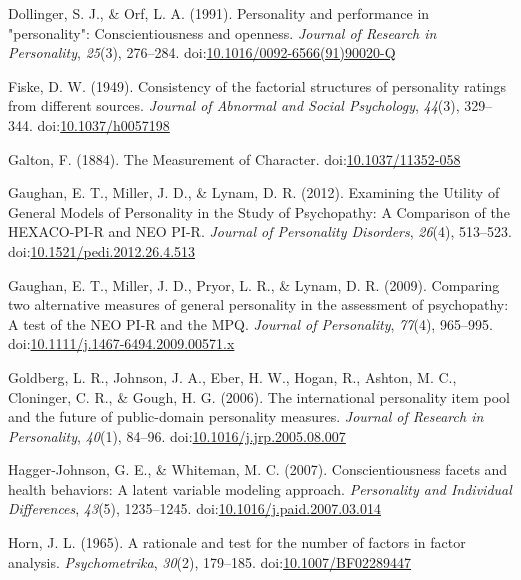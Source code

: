 \documentclass[,man]{apa6}
\theoremstyle{definition}
\theoremstyle{definition}
\theoremstyle{definition}
\theoremstyle{remark}
\begin{document}
\leavevmode\hypertarget{ref-Dollinger1991}{}%
Dollinger, S. J., \& Orf, L. A. (1991). Personality and performance in
"personality": Conscientiousness and openness. \emph{Journal of Research
in Personality}, \emph{25}(3), 276--284.
doi:\href{https://doi.org/10.1016/0092-6566(91)90020-Q}{10.1016/0092-6566(91)90020-Q}

\leavevmode\hypertarget{ref-Fiske1949}{}%
Fiske, D. W. (1949). Consistency of the factorial structures of
personality ratings from different sources. \emph{Journal of Abnormal
and Social Psychology}, \emph{44}(3), 329--344.
doi:\href{https://doi.org/10.1037/h0057198}{10.1037/h0057198}

\leavevmode\hypertarget{ref-Galton1884}{}%
Galton, F. (1884). The Measurement of Character.
doi:\href{https://doi.org/10.1037/11352-058}{10.1037/11352-058}

\leavevmode\hypertarget{ref-Gaughan2012}{}%
Gaughan, E. T., Miller, J. D., \& Lynam, D. R. (2012). Examining the
Utility of General Models of Personality in the Study of Psychopathy: A
Comparison of the HEXACO-PI-R and NEO PI-R. \emph{Journal of Personality
Disorders}, \emph{26}(4), 513--523.
doi:\href{https://doi.org/10.1521/pedi.2012.26.4.513}{10.1521/pedi.2012.26.4.513}

\leavevmode\hypertarget{ref-Gaughan2009}{}%
Gaughan, E. T., Miller, J. D., Pryor, L. R., \& Lynam, D. R. (2009).
Comparing two alternative measures of general personality in the
assessment of psychopathy: A test of the NEO PI-R and the MPQ.
\emph{Journal of Personality}, \emph{77}(4), 965--995.
doi:\href{https://doi.org/10.1111/j.1467-6494.2009.00571.x}{10.1111/j.1467-6494.2009.00571.x}

\leavevmode\hypertarget{ref-Goldberg2006}{}%
Goldberg, L. R., Johnson, J. A., Eber, H. W., Hogan, R., Ashton, M. C.,
Cloninger, C. R., \& Gough, H. G. (2006). The international personality
item pool and the future of public-domain personality measures.
\emph{Journal of Research in Personality}, \emph{40}(1), 84--96.
doi:\href{https://doi.org/10.1016/j.jrp.2005.08.007}{10.1016/j.jrp.2005.08.007}

\leavevmode\hypertarget{ref-Hagger-Johnson2007}{}%
Hagger-Johnson, G. E., \& Whiteman, M. C. (2007). Conscientiousness
facets and health behaviors: A latent variable modeling approach.
\emph{Personality and Individual Differences}, \emph{43}(5), 1235--1245.
doi:\href{https://doi.org/10.1016/j.paid.2007.03.014}{10.1016/j.paid.2007.03.014}

\leavevmode\hypertarget{ref-Horn1965}{}%
Horn, J. L. (1965). A rationale and test for the number of factors in
factor analysis. \emph{Psychometrika}, \emph{30}(2), 179--185.
doi:\href{https://doi.org/10.1007/BF02289447}{10.1007/BF02289447}
\end{document}
